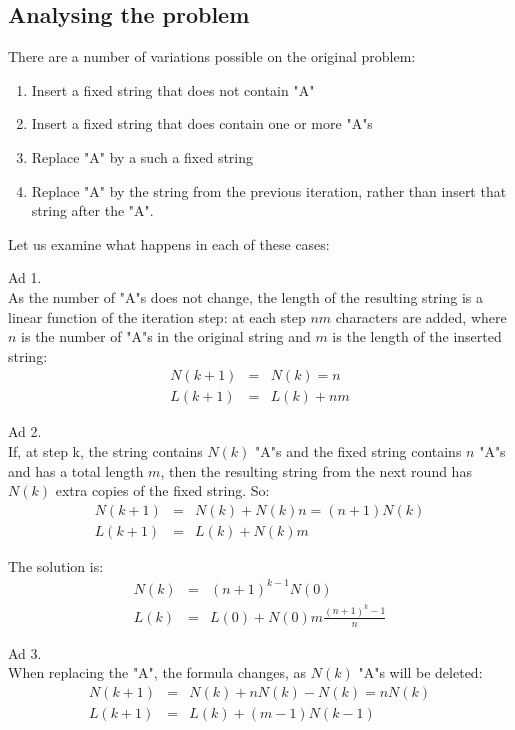 \documentclass[onecolumn]{article}
\begin{document}
\subsection*{Analysing the problem}

There are a number of variations possible on the original problem:
\begin{enumerate}
\item
Insert a fixed string that does not contain "A"
\item
Insert a fixed string that does contain one or more "A"s
\item
Replace "A" by a such a fixed string
\item
Replace "A" by the string from the previous iteration, rather than insert that string after the "A".
\end{enumerate}

Let us examine what happens in each of these cases:

\noindent Ad 1. \\
As the number of "A"s does not change, the length of the resulting string is a linear function of
the iteration step: at each step $n m$ characters are added, where $n$ is the number of "A"s
in the original string and $m$ is the length of the inserted string:
\begin{eqnarray*}
          N(k+1) &=& N(k) = n                         \\
          L(k+1) &=& L(k) + n m
\end{eqnarray*}

\noindent Ad 2. \\
If, at step k, the string contains $N(k)$ "A"s and the fixed string contains $n$ "A"s and
has a total length $m$, then the resulting string from the next round has $N(k)$ extra copies
of the fixed string. So:
\begin{eqnarray*}
          N(k+1) &=& N(k) + N(k) n = (n+1) N(k)       \\
          L(k+1) &=& L(k) + N(k) m
\end{eqnarray*}

The solution is:
\begin{eqnarray*}
          N(k) &=& (n+1)^{k-1} N(0)                   \\
          L(k) &=& L(0) + N(0) m \frac{(n+1)^k -1}{n}
\end{eqnarray*}

\noindent Ad 3. \\
When replacing the "A", the formula changes, as $N(k)$ "A"s will be deleted:
\begin{eqnarray*}
          N(k+1) &=& N(k) + n N(k) - N(k) = n  N(k)   \\
          L(k+1) &=& L(k) + (m-1) N(k-1)
\end{eqnarray*}
\end{document}
